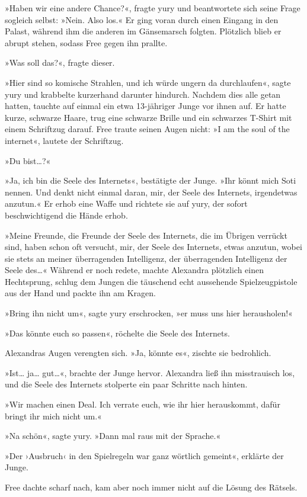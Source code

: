 »Haben wir eine andere Chance?«, fragte yury und beantwortete sich seine Frage sogleich selbst: »Nein. Also los.« Er ging voran durch einen Eingang in den Palast, während ihm die anderen im Gänsemarsch folgten. Plötzlich blieb er abrupt stehen, sodass Free gegen ihn prallte.

»Was soll das?«, fragte dieser.

»Hier sind so komische Strahlen, und ich würde ungern da durchlaufen«, sagte yury und krabbelte kurzerhand darunter hindurch. Nachdem dies alle getan hatten, tauchte auf einmal ein etwa 13-jähriger Junge vor ihnen auf. Er hatte kurze, schwarze Haare, trug eine schwarze Brille und ein schwarzes T-Shirt mit einem Schriftzug darauf. Free traute seinen Augen nicht: »I am the soul of the internet«, lautete der Schriftzug.

»Du bist…?«

»Ja, ich bin die Seele des Internets«, bestätigte der Junge. »Ihr könnt mich Soti nennen. Und denkt nicht einmal daran, mir, der Seele des Internets, irgendetwas anzutun.« Er erhob eine Waffe und richtete sie auf yury, der sofort beschwichtigend die Hände erhob.

»Meine Freunde, die Freunde der Seele des Internets, die im Übrigen verrückt sind, haben schon oft versucht, mir, der Seele des Internets, etwas anzutun, wobei sie stets an meiner überragenden Intelligenz, der überragenden Intelligenz der Seele des…« Während er noch redete, machte Alexandra plötzlich einen Hechtsprung, schlug dem Jungen die täuschend echt aussehende Spielzeugpistole aus der Hand und packte ihn am Kragen.

»Bring ihn nicht um«, sagte yury erschrocken, »er muss uns hier herausholen!«

»Das könnte euch so passen«, röchelte die Seele des Internets.

Alexandras Augen verengten sich. »Ja, könnte es«, zischte sie bedrohlich.

»Ist… ja… gut…«, brachte der Junge hervor. Alexandra ließ ihn misstrauisch los, und die Seele des Internets stolperte ein paar Schritte nach hinten.

»Wir machen einen Deal. Ich verrate euch, wie ihr hier herauskommt, dafür bringt ihr mich nicht um.«

»Na schön«, sagte yury. »Dann mal raus mit der Sprache.«

»Der ›Ausbruch‹ in den Spielregeln war ganz wörtlich gemeint«, erklärte der Junge.

Free dachte scharf nach, kam aber noch immer nicht auf die Lösung des Rätsels.

